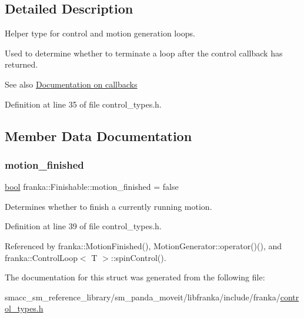 \subsection{Detailed Description}
Helper type for control and motion generation loops.

Used to determine whether to terminate a loop after the control callback has returned.

\begin{DoxySeeAlso}{See also}
\hyperlink{classfranka_1_1Robot_callback-docs}{Documentation on callbacks} 
\end{DoxySeeAlso}


Definition at line 35 of file control\+\_\+types.\+h.



\subsection{Member Data Documentation}
\mbox{\label{structfranka_1_1Finishable_a5d48028c0f912d4a089e6220d8715f7f}} 
\subsubsection{\texorpdfstring{motion\+\_\+finished}{motion\_finished}}
{\footnotesize\ttfamily \hyperlink{classbool}{bool} franka\+::\+Finishable\+::motion\+\_\+finished = false}

Determines whether to finish a currently running motion. 

Definition at line 39 of file control\+\_\+types.\+h.



Referenced by franka\+::\+Motion\+Finished(), Motion\+Generator\+::operator()(), and franka\+::\+Control\+Loop$<$ T $>$\+::spin\+Control().



The documentation for this struct was generated from the following file\+:\begin{DoxyCompactItemize}
\item 
smacc\+\_\+sm\+\_\+reference\+\_\+library/sm\+\_\+panda\+\_\+moveit/libfranka/include/franka/\hyperlink{control__types_8h}{control\+\_\+types.\+h}\end{DoxyCompactItemize}
